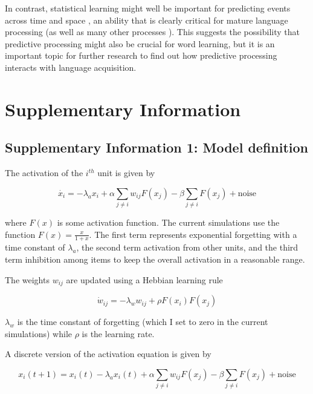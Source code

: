\documentclass[
]{article}
\begin{document}
In contrast, statistical learning might well be important for predicting
events across time
\citep{Endress-stat-recall, Morgan2019, Sherman2020, Turk-Browne2010, Verosky2021}
and space \citep{Theeuwes2022}, an ability that is clearly critical for
mature language processing \citep{Levy2008, Trueswell1999} (as well as
many other processes \citep{Clark2013, Friston2010, Keller2018}). This
suggests the possibility that predictive processing might also be
crucial for word learning, but it is an important topic for further
research to find out how predictive processing interacts with language
acquisition.

\clearpage

\hypertarget{supplementary-information}{%
\section{Supplementary Information}\label{supplementary-information}}

\hypertarget{supplementary-information-1-model-definition}{%
\subsection{Supplementary Information 1: Model
definition}\label{supplementary-information-1-model-definition}}

The activation of the \(i^{th}\) unit is given by

\[
\dot{x_i} = -\lambda_a x_i + \alpha \sum_{j \neq i} w_{ij} F(x_j) - \beta \sum_{j \neq i} F(x_j) + \text{noise}
\]

where \(F(x)\) is some activation function. The current simulations use
the function \(F(x) = \frac{x}{1 + x}\). The first term represents
exponential forgetting with a time constant of \(\lambda_a\), the second
term activation from other units, and the third term inhibition among
items to keep the overall activation in a reasonable range.

The weights \(w_{ij}\) are updated using a Hebbian learning rule

\[
\dot{w}_{ij} = - \lambda_w w_{ij} + \rho F(x_i) F(x_j) 
\]

\(\lambda_w\) is the time constant of forgetting (which I set to zero in
the current simulations) while \(\rho\) is the learning rate.

A discrete version of the activation equation is given by

\[
x_i (t+1) = x_i (t) - \lambda_a x_i(t) + \alpha \sum_{j \neq i} w_{ij} F(x_j) - \beta \sum_{j \neq i} F(x_j) + \text{noise}
\]
\end{document}
